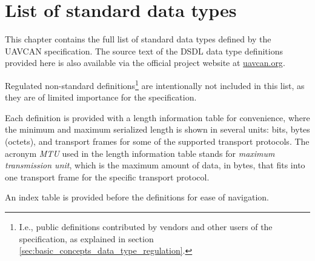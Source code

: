 \chapter{List of standard data types}

This chapter contains the full list of standard data types defined by the UAVCAN specification.
The source text of the DSDL data type definitions provided here is also available via the
official project website at \href{http://uavcan.org}{uavcan.org}.

Regulated non-standard definitions\footnote{I.e., public definitions contributed by vendors and other users
of the specification, as explained in section \ref{sec:basic_concepts_data_type_regulation}.}
are intentionally not included in this list, as they are of limited importance for the specification.

Each definition is provided with a length information table for convenience,
where the minimum and maximum serialized length is shown in several units:
bits, bytes (octets), and transport frames for some of the supported transport protocols.
The acronym \emph{MTU} used in the length information table stands for
\emph{maximum transmission unit}, which is the maximum amount of data, in bytes,
that fits into one transport frame for the specific transport protocol.

An index table is provided before the definitions for ease of navigation.

\clearpage{}
